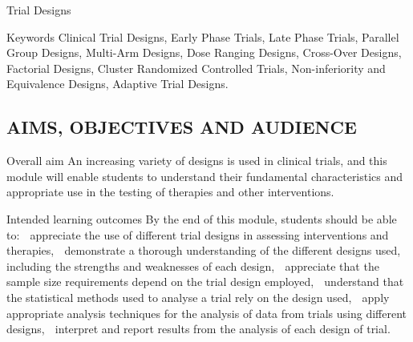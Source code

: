 Trial Designs

Keywords Clinical Trial Designs, Early Phase Trials, Late Phase Trials, Parallel Group
Designs, Multi-Arm Designs, Dose Ranging Designs, Cross-Over Designs,
Factorial Designs, Cluster Randomized Controlled Trials, Non-inferiority and
Equivalence Designs, Adaptive Trial Designs.

\subsection{AIMS, OBJECTIVES AND AUDIENCE}
Overall aim An increasing variety of designs is used in clinical trials, and this module will
enable students to understand their fundamental characteristics and
appropriate use in the testing of therapies and other interventions.

Intended learning
outcomes
By the end of this module, students should be able to:
 appreciate the use of different trial designs in assessing interventions and
therapies,
 demonstrate a thorough understanding of the different designs used,
including the strengths and weaknesses of each design,
 appreciate that the sample size requirements depend on the trial design
employed,
 understand that the statistical methods used to analyse a trial rely on the
design used,
 apply appropriate analysis techniques for the analysis of data from trials
using different designs,
 interpret and report results from the analysis of each design of trial.
